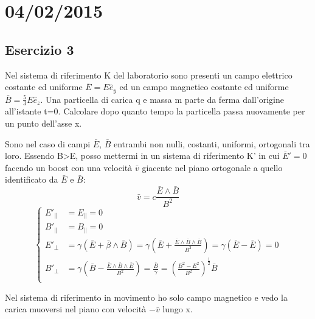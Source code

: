 \chapter*{04/02/2015}
\section*{Esercizio 3}
Nel sistema di riferimento K del laboratorio sono presenti un campo elettrico 
costante ed uniforme $\bar E = E \hat e_y$ ed un campo magnetico costante ed
uniforme $\bar B = \frac{5}{3} E \hat e_z $. Una particella di carica q e massa
m parte da ferma dall'origine all'istante t=0. Calcolare dopo quanto tempo la 
particella passa nuovamente per un punto dell'asse x.

\vspace{5 mm} %

Sono nel caso di campi $\bar E$, $\bar B$ entrambi non nulli, costanti, uniformi,
ortogonali tra loro.
Essendo B>E, posso mettermi in un sistema di riferimento K' in cui $\bar E'=0$
facendo un boost con una velocit\`a $\bar v$ giacente nel piano ortogonale
a quello identificato da $\bar E$ e $\bar B$:
\begin{equation}
\bar v = c \frac{\bar E \wedge \bar B}{B^2}
\end{equation}
\begin{equation}
\begin{cases}
E'_{\parallel} & = E_{\parallel} = 0 \\
B'_{\parallel} & = B_{\parallel} = 0 \\
E'_{\bot} & = \gamma(\bar E + \bar\beta \wedge \bar B)= \gamma(\bar E + \frac{\bar E \wedge \bar B 
\wedge \bar B}{B^2}) = \gamma(\bar E - \bar E) = 0 \\

B'_{\bot} & = \gamma(\bar B - \frac{\bar E \wedge \bar B 
\wedge \bar E}{B^2}) = \frac{\bar B}{\gamma} = (\frac{B^2-E^2}{B^2})^\frac{1}{2} \bar B\\
\end{cases}
\end{equation}

Nel sistema di riferimento in movimento ho solo campo magnetico e vedo la carica muoversi nel
piano con velocit\`a $-\bar v$ lungo x.
